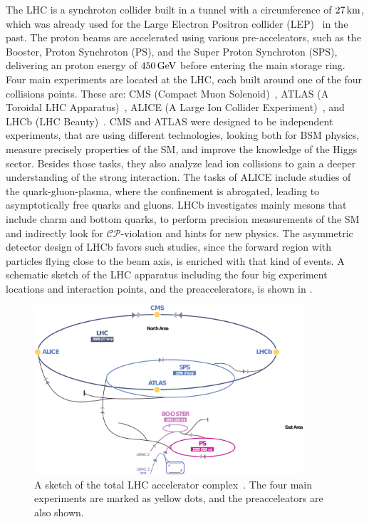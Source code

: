 The LHC is a synchroton collider built in a tunnel with a circumference of $27\,\text{km}$, which was already used for the Large Electron Positron collider (LEP)~\cite{LEPCollider} in the past. The proton beams are accelerated using various pre-acceleators, such as the Booster, Proton Synchroton (PS), and the Super Proton Synchroton (SPS), delivering an proton energy of $450\,\text{Ge\hspace{-.08em}V}$ before entering the main storage ring. Four main experiments are located at the LHC, each built around one of the four collisions points. These are: CMS (Compact Muon Solenoid)~\cite{CMS}, ATLAS (A Toroidal LHC Apparatus)~\cite{ATLAS}, ALICE (A Large Ion Collider Experiment)~\cite{ALICE}, and LHCb (LHC Beauty)~\cite{LHCb}. CMS and ATLAS were designed to be independent experiments, that are using different technologies, looking both for BSM physics, measure precisely properties of the SM, and improve the knowledge of the Higgs sector. Besides those tasks, they also analyze lead ion collisions to gain a deeper understanding of the strong interaction. The tasks of ALICE include studies of the quark-gluon-plasma, where the confinement is abrogated, leading to asymptotically free quarks and gluons. LHCb investigates mainly mesons that include charm and bottom quarks, to perform precision measurements of the SM and indirectly look for $\mathcal{CP}$-violation and hints for new physics. The asymmetric detector design of LHCb favors such studies, since the forward region with particles flying close to the beam axis, is enriched with that kind of events. A schematic sketch of the LHC apparatus including the four big experiment locations and interaction points, and the preaccelerators, is shown in .\\
\begin{figure}[tbp]
 \centering
 \includegraphics[width=0.89\textwidth]{figures/general/LHC}
 \caption{A sketch of the total LHC accelerator complex~\cite{LHCPicture}. The four main experiments are marked as yellow dots, and the preacceleators are also shown.}
 \label{fig:LHC}
\end{figure}
